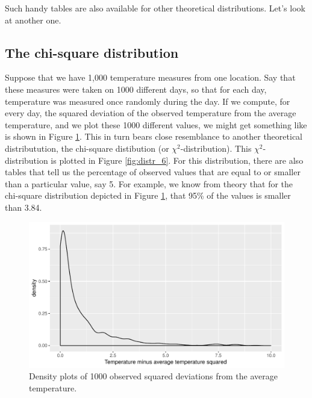 \documentclass[]{report}\usepackage[]{graphicx}\usepackage[]{color}
\makeatletter
\def\maxwidth{ %
  \ifdim\Gin@nat@width>\linewidth
    \linewidth
  \else
    \Gin@nat@width
  \fi
}
\newenvironment{knitrout}{}{} %
\makeatother
\begin{document}
Such handy tables are also available for other theoretical distributions. Let's look at another one.

\subsection{The chi-square distribution}
Suppose that we have 1,000 temperature measures from one location. Say that these measures were taken on 1000 different days, so that for each day, temperature was measured once randomly during the day. If we compute, for every day, the squared deviation of the observed temperature from the average temperature, and we plot these 1000 different values, we might get something like is shown in Figure \ref{fig:distr_5}. This in turn bears close resemblance to another theoretical distributution, the chi-square distibution (or $\chi^2$-distribution). This $\chi^2$-distribution is plotted in Figure \ref{fig:distr_6}. For this distribution, there are also tables that tell us the percentage of observed values that are equal to or smaller than a particular value, say 5. For example, we know from theory that for the chi-square distribution depicted in Figure \ref{fig:distr_5}, that 95\% of the values is smaller than 3.84.

\begin{knitrout}
\color{fgcolor}\begin{figure}

{\centering \includegraphics[width=\maxwidth]{figure/distr_5-1} 

}

\caption[Density plots of 1000 observed squared deviations from the average temperature]{Density plots of 1000 observed squared deviations from the average temperature.}\label{fig:distr_5}
\end{figure}


\end{knitrout}
% 
\end{document}
